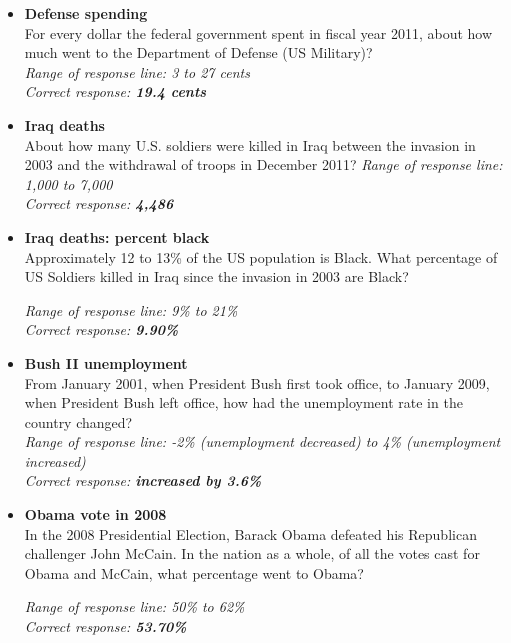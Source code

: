 \documentclass[12pt, letterpaper]{article}
\begin{document}
\large {}

\normalsize 

\begin{itemize}
\item \textbf{Defense spending} \\
For every dollar the federal government spent in fiscal year 2011, about how much went to the Department of Defense (US Military)?
\\ \textit{Range of response line: 3 to 27 cents}
\\ \textit{Correct response: \textbf{19.4 cents}}
   \end{itemize}

\begin{itemize}
\item \textbf{Iraq deaths} \\
About how many U.S. soldiers were killed in Iraq between the invasion in 2003 and the withdrawal of troops in December 2011?
 \textit{Range of response line: 1,000 to 7,000}
\\ \textit{Correct response: \textbf{4,486}}
   \end{itemize}

\begin{itemize}
\item \textbf{Iraq deaths: percent black} \\
Approximately 12 to 13\% of the US population is Black. What percentage of US Soldiers killed in Iraq since the invasion in 2003 are Black?

 \textit{Range of response line: 9\% to 21\%}
\\ \textit{Correct response: \textbf{9.90\%}}
   \end{itemize}

\begin{itemize}
\item \textbf{Bush II unemployment} \\
From January 2001, when President Bush first took office, to January 2009, when President Bush left office, how had the unemployment rate in the country changed?
\\ \textit{Range of response line: -2\% (unemployment decreased) to 4\% (unemployment increased)}
\\ \textit{Correct response: \textbf{increased by 3.6\%}}
   \end{itemize}

\begin{itemize}
\item \textbf{Obama vote in 2008} \\
In the 2008 Presidential Election, Barack Obama defeated his Republican challenger John McCain. In the nation as a whole, of all the votes cast for Obama and McCain, what percentage went to Obama?

 \textit{Range of response line: 50\% to 62\%}
\\ \textit{Correct response: \textbf{53.70\%}}
   \end{itemize}
   
\end{document}

